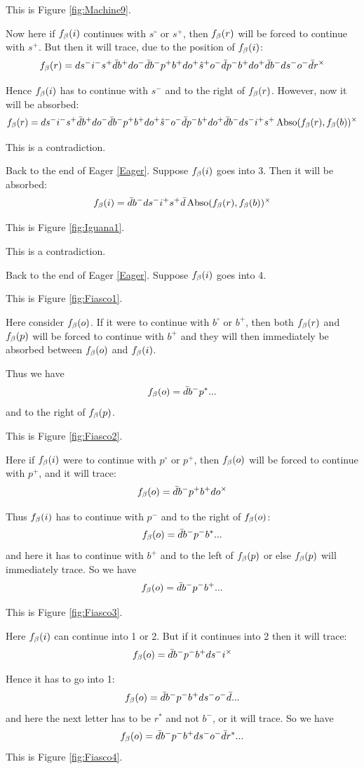 This is Figure \ref{fig:Machine9}.

Now here if $f_\beta(i)$ continues with $s^\circ$ or $s^+$, then $f_\beta(r)$ will be forced to continue with $s^+$. But then it will trace, due to the position of $f_\beta(i)$:
\[
f_\beta(r) = d s^- i^- s^+ \bar{d} b^+ d o^- \bar{d} b^- p^+ b^+ d o^+ \hat{s}^+ o^- \bar{d} p^- b^+ d o^+ \bar{d} b^- d s^- o^- \bar{d} r^\times
\]

Hence $f_\beta(i)$ has to continue with $s^-$ and to the right of $f_\beta(r)$. However, now it will be absorbed:
\[
f_\beta(r) = d s^- i^- s^+ \bar{d} b^+ d o^- \bar{d} b^- p^+ b^+ d o^+ \hat{s}^- o^- \bar{d} p^- b^+ d o^+ \bar{d} b^- d s^- i^+ s^+ \operatorname{Abso}(f_\beta(r), f_\beta(b))^\times
\]

This is a contradiction.



\label{Iguana}
Back to the end of Eager \ref{Eager}. Suppose $f_\beta(i)$ goes into 3. Then it will be absorbed:
\[
f_\beta(i) =  \bar{d} b^- d s^- i^+ s^+ \bar{d} \operatorname{Abso}(f_\beta(r), f_\beta(b))^\times
\]

This is Figure \ref{fig:Iguana1}.

This is a contradiction.

\label{Fiasco}
Back to the end of Eager \ref{Eager}. Suppose $f_\beta(i)$ goes into 4. 

This is Figure \ref{fig:Fiasco1}.

Here consider $f_\beta(o)$. If it were to continue with $b^\circ$ or $b^+$, then both $f_\beta(r)$ and $f_\beta(p)$ will be forced to continue with $b^+$ and they will then immediately be absorbed between $f_\beta(o)$ and $f_\beta(i)$.


Thus we have
\[
f_\beta(o) = \bar{d} b^- p^*...
\]
and to the right of $f_\beta(p)$.

This is Figure \ref{fig:Fiasco2}.

Here if $f_\beta(i)$ were to continue with $p^\circ$ or $p^+$, then $f_\beta(o)$ will be forced to continue with $p^+$, and it will trace:
\[
f_\beta(o) = \bar{d} b^- p^+ b^+ d o^\times
\]

Thus $f_\beta(i)$ has to continue with $p^-$ and to the right of $f_\beta(o)$:
\[
f_\beta(o) = \bar{d} b^- p^- b^*...
\]
and here it has to continue with $b^+$ and to the left of $f_\beta(p)$ or else $f_\beta(p)$ will immediately trace. So we have
\[
f_\beta(o) = \bar{d} b^- p^- b^+...
\]

This is Figure \ref{fig:Fiasco3}.

Here $f_\beta(i)$ can continue into 1 or 2. But if it continues into 2 then it will trace:
\[
f_\beta(o) = \bar{d} b^- p^- b^+ d s^- i^\times
\]

Hence it has to go into 1:
\[
f_\beta(o) = \bar{d} b^- p^- b^+ d s^- o^- \bar{d}...
\]
and here the next letter has to be $r^*$ and not $b^-$, or it will trace. So we have
\[
f_\beta(o) = \bar{d} b^- p^- b^+ d s^- o^- \bar{d} r^*...
\]
This is Figure \ref{fig:Fiasco4}.

